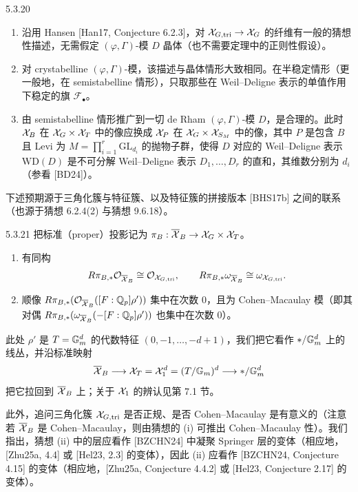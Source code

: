 \begin{rem}{5.3.20}\label{rem:a4-5-3-20}
\begin{enumerate}[label=(\roman*),leftmargin=2.2em,itemsep=0.1em]
\item 沿用 Hansen [Han17, Conjecture 6.2.3]，对 $\mathcal{X}_{G,\mathrm{tri}}\to\mathcal{X}_G$ 的纤维有一般的猜想性描述，无需假定 $(\varphi,\Gamma)$-模 $D$ 晶体（也不需要定理中的正则性假设）。
\item 对 crystabelline $(\varphi,\Gamma)$-模，该描述与晶体情形大致相同。在半稳定情形（更一般地，在 semistabelline 情形），只取那些在 Weil–Deligne 表示的单值作用下稳定的旗 $\mathcal F_\bullet$。
\item 由 semistabelline 情形推广到一切 de Rham $(\varphi,\Gamma)$-模 $D$，是合理的。此时 $\mathcal{X}_B$ 在 $\mathcal{X}_G\times\mathcal{X}_T$ 中的像应换成 $\mathcal{X}_P$ 在 $\mathcal{X}_G\times\mathcal{X}_{S_M}$ 中的像，其中 $P$ 是包含 $B$ 且 Levi 为 $M=\prod_{i=1}^{r}\mathrm{GL}_{d_i}$ 的抛物子群，使得 $D$ 对应的 Weil–Deligne 表示 $\mathrm{WD}(D)$ 是不可分解 Weil–Deligne 表示 $D_1,\dots,D_r$ 的直和，其维数分别为 $d_i$（参看 [BD24]）。
\end{enumerate}
\end{rem}

下述预期源于三角化簇与特征簇、以及特征簇的拼接版本 [BHS17b] 之间的联系（也源于猜想 6.2.4(2) 与猜想 9.6.18）。


\begin{conj}{5.3.21}\label{conj:a4-5-3-21}
把标准（proper）投影记为 $\pi_B:\overline{\mathcal{X}}_B\to\mathcal{X}_G\times\mathcal{X}_T$。
\begin{enumerate}[label=(\roman*),leftmargin=2.2em,itemsep=0.1em]
\item 有同构
\[
R\pi_{B,*}\mathcal{O}_{\overline{\mathcal{X}}_B}\cong\mathcal{O}_{\mathcal{X}_{G,\mathrm{tri}}},\qquad
R\pi_{B,*}\omega_{\overline{\mathcal{X}}_B}\cong\omega_{\mathcal{X}_{G,\mathrm{tri}}}.
\]
\item 顺像 $R\pi_{B,*}(\mathcal{O}_{\overline{\mathcal{X}}_B}([F:\mathbb{Q}_p]\rho'))$ 集中在次数 $0$，且为 Cohen–Macaulay 模（即其对偶 $R\pi_{B,*}(\omega_{\overline{\mathcal{X}}_B}(-[F:\mathbb{Q}_p]\rho'))$ 也集中在次数 $0$）。
\end{enumerate}
\end{conj}

此处 $\rho'$ 是 $T=\mathbb{G}_m^d$ 的代数特征 $(0,-1,\dots,-d+1)$，我们把它看作 $*/\mathbb{G}_m^d$ 上的线丛，并沿标准映射
\[
\overline{\mathcal{X}}_B\longrightarrow\mathcal{X}_T=\mathcal{X}_1^d=(T/\mathbb{G}_m)^d\longrightarrow*/\mathbb{G}_m^d
\]
把它拉回到 $\overline{\mathcal{X}}_B$ 上；关于 $\mathcal{X}_1$ 的辨认见第 7.1 节。

此外，追问三角化簇 $\mathcal{X}_{G,\mathrm{tri}}$ 是否正规、是否 Cohen–Macaulay 是有意义的（注意若 $\overline{\mathcal{X}}_B$ 是 Cohen–Macaulay，则由猜想的 (i) 可推出 Cohen–Macaulay 性）。我们指出，猜想 (ii) 中的层应看作 [BZCHN24] 中凝聚 Springer 层的变体（相应地，[Zhu25a, 4.4] 或 [Hel23, 2.3] 的变体），因此 (ii) 应看作 [BZCHN24, Conjecture 4.15] 的变体（相应地，[Zhu25a, Conjecture 4.4.2] 或 [Hel23, Conjecture 2.17] 的变体）。

